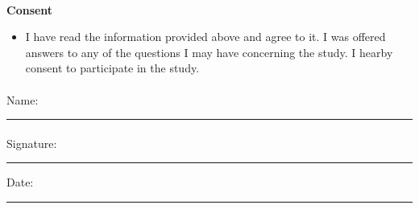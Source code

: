 \documentclass[12pt,fleqn]{scrreprt}
\begin{document}
\paragraph{}
{\large \bf Consent}
\begin{itemize}
    \item I have read the information provided above and agree to it. I was offered answers to any of the questions I may have concerning the study. I hearby consent to participate in the study.
\end{itemize}
\paragraph{}
Name: \rule{8cm}{0.4pt}
\paragraph{}
Signature: \rule{6cm}{0.4pt}  \hspace{1.4cm} Date: \rule{6cm}{0.4pt}
\end{document}
